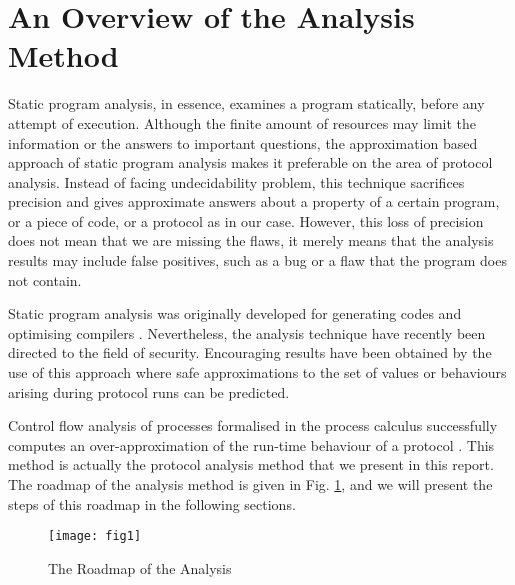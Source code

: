 \section{An Overview of the Analysis Method}
Static program analysis, in essence, examines a program statically,
before any attempt of execution. Although the finite amount of
resources may limit the information or the answers to important
questions, the approximation based approach of static program analysis makes
it preferable on the area of protocol analysis. Instead of facing
undecidability problem, this technique sacrifices precision and
gives approximate answers about a property of a certain program, or a
piece of code, or a protocol as in our case. However, this loss of
precision does not mean that we are missing the flaws, it merely
means that the analysis results may include false positives, such as a
bug or a flaw that the program does not contain.

Static program analysis was originally developed for generating codes
and optimising compilers \cite{Lowrey:Medlock,Busam:Englund}. Nevertheless, the analysis
technique have recently been directed to the field of
security. Encouraging results have been obtained by the use of this
approach where safe approximations to the set of values or behaviours
arising during protocol runs can be predicted.

Control flow analysis of processes formalised in the \LYSA process
calculus successfully computes an over-approximation of the run-time
behaviour of a protocol \cite{bod:2, bod:1}. This method is actually the
protocol analysis method that we present in this report.
The roadmap of the analysis method is given in Fig. \ref{fig:flow},
and we will present the steps of this roadmap in the following sections.
\begin{figure}[!t]
\centering
\texttt{[image: fig1]}
\caption{The Roadmap of the Analysis}
\label{fig:flow}
\end{figure}


